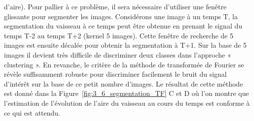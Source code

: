 d’aire). Pour pallier à ce problème, il sera nécessaire d’utiliser une fenêtre glissante pour segmenter
les images. Considérons une image à un temps T, la segmentation du vaisseau à ce temps peut être
obtenue en prenant le signal du temps T-2 au temps T+2 (kernel 5 images). Cette fenêtre de recherche
de 5 images est ensuite décalée pour obtenir la segmentation à T+1. Sur la base de 5 images il devient
très difficile de discriminer deux classes dans l’approche « clustering ». En revanche, le critère de la
méthode de transformée de Fourier se révèle suffisamment robuste pour discriminer facilement le
bruit du signal d’intérêt sur la base de ce petit nombre d’images. Le résultat de cette méthode est
donné dans la Figure~\ref{fig:3_6_segmentation_TF} C et D où l’on montre que l’estimation de l’évolution de l’aire du vaisseau au
cours du temps est conforme à ce qui est attendu.
